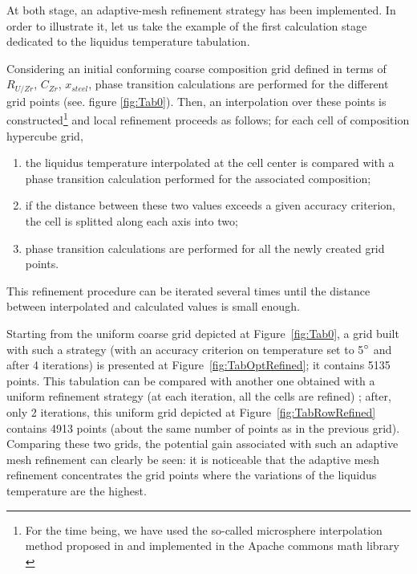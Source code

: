 \documentclass[11pt]{article}\usepackage{geometry} \geometry{letterpaper, margin=25.4mm}
\newcommand{\Fig}[1]{Figure~\ref{fig:#1}}
\begin{document}
At both stage, an adaptive-mesh refinement strategy has been implemented. In order to illustrate it, let us take the example of the first calculation stage dedicated to the liquidus temperature tabulation. 

Considering an initial conforming coarse composition grid defined in terms of $R_{U/Zr}$, $C_{Zr}$, $x_{steel}$, phase transition calculations are performed for the different grid points (see. figure \ref{fig:Tab0}). Then, an interpolation over these points is constructed\footnote{For the time being, we have used the so-called microsphere interpolation method proposed in \cite{Dudziak2007} and implemented in the Apache commons math library \cite{Apache2016}} and local refinement proceeds as follows; for each cell of composition hypercube grid,
\begin{enumerate}
 \item the liquidus temperature interpolated at the cell center is compared with a phase transition calculation performed for the associated composition;
 \item if the distance between these two values exceeds a given accuracy criterion, the cell is splitted along each axis into two;
 \item phase transition calculations are performed for all the newly created grid points.
\end{enumerate}
This refinement procedure can be iterated several times until the distance between interpolated and calculated values is small enough. 

Starting from the uniform coarse grid depicted at \Fig{Tab0}, a grid built with such a strategy (with an accuracy criterion on temperature set to 5$\degree$ and after 4 iterations) is presented at \Fig{TabOptRefined}; it contains 5135 points. This tabulation can be compared with another one obtained with a uniform refinement strategy (at each iteration, all the cells are refined) ; after, only 2 iterations, this uniform grid depicted at \Fig{TabRowRefined} contains 4913 points (about the same number of points as in the previous grid). Comparing these two grids, the potential gain associated with such an adaptive mesh refinement can clearly be seen: it is noticeable that the adaptive mesh refinement concentrates the grid points where the variations of the liquidus temperature are the highest. 
\end{document}
